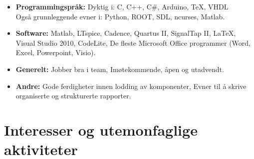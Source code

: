 \documentclass[11pt,a4paper,sans, norsk]{moderncv}        %
\begin{document}
\begin{itemize}

\item \textbf{Programmingspråk:} Dyktig i: C, C++, C\#, Arduino, TeX, VHDL \\ Også grunnleggende evner i: Python, ROOT, SDL, ncurses, Matlab.

\vspace{6pt}

\item \textbf{Software:} Matlab, LTspice, Cadence, Quartus II, SignalTap II, LaTeX, Visual Studio 2010, CodeLite, De fleste Microsoft Office programmer (Word, Excel, Powerpoint, Visio).

\vspace{6pt}

\item \textbf{Generelt:} Jobber bra i team, Imøtekommende, åpen og utadvendt.

\vspace{6pt}

\item \textbf{Andre:} Gode ferdigheter innen lodding av komponenter, Evner til å skrive organiserte og strukturerte rapporter.

\end{itemize}

\newpage

\section{Interesser og utemonfaglige aktiviteter}

\vspace{6pt}
\end{document}
